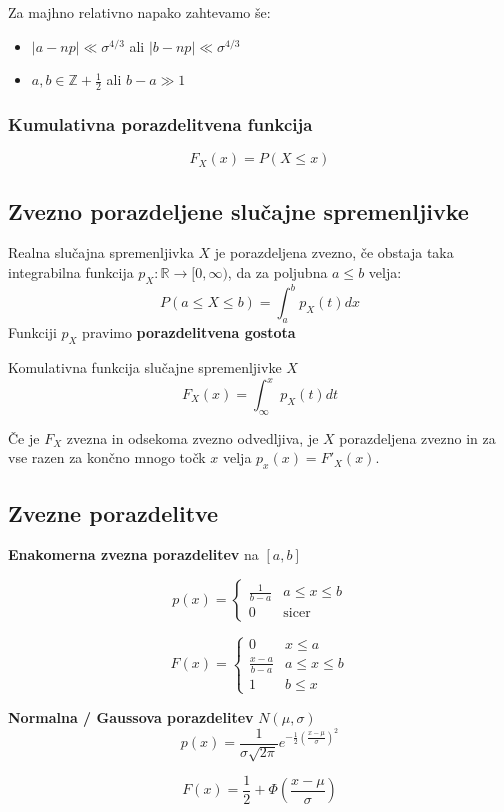 \begin{multicols}{4}
Za majhno relativno napako zahtevamo še: 
\begin{itemize}
	\item $|a-np| \ll \sigma^{4/3}$ ali $|b-np| \ll \sigma^{4/3}$ 
	\item $a, b \in \mathbb{Z} + \frac{1}{2}$ ali $b - a \gg 1$
\end{itemize}

\subsubsection{Kumulativna porazdelitvena funkcija}
\[ F_X(x) = P(X \leq x)\]

\subsection{Zvezno porazdeljene slučajne spremenljivke}
Realna slučajna spremenljivka $X$ je porazdeljena zvezno, če obstaja taka integrabilna funkcija $p_X: \mathbb{R} \to [0, \infty)$, da za poljubna $a \leq b$ velja:
\[ P( a \leq X \leq b) = \int_a^b p_X(t) dx \]
Funkciji $p_X$ pravimo \textbf{porazdelitvena gostota}


Komulativna funkcija slučajne spremenljivke $X$
\[ F_X(x) = \int_{\infty}^x p_X(t) dt \]

Če je $F_X$ zvezna in odsekoma zvezno odvedljiva, je $X$ porazdeljena zvezno in za vse razen za končno mnogo točk $x$ velja $p_x(x) = F'_X(x)$.

\subsection{Zvezne porazdelitve}
\textbf{Enakomerna zvezna porazdelitev} na $ [a, b] $

\[ p(x) = \begin{cases}
	\frac{1}{b-a} & a \leq x \leq b \\
	0 & \text{sicer}
\end{cases}\]

\[ F(x) = \begin{cases}
	0 & x \leq a \\
	\frac{x-a}{b-a} & a \leq x \leq b \\
	1 & b \leq x
\end{cases}\]

\textbf{Normalna / Gaussova porazdelitev} $N(\mu, \sigma)$
\[ p(x) = \frac{1}{\sigma \sqrt{2\pi}} e^{-\frac{1}{2} \left( \frac{x-\mu}{\sigma} \right)^2}\]

\[ F(x) = \frac{1}{2} + \Phi\left(\frac{x-\mu}{\sigma}\right)\]


\end{multicols}
